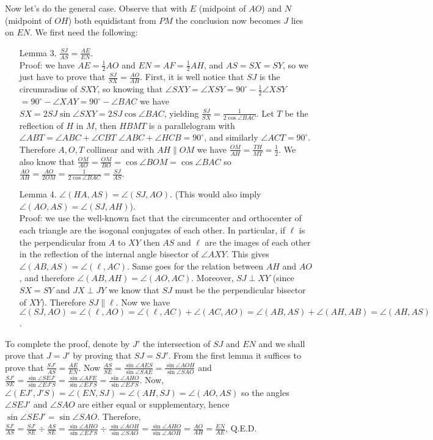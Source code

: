 \documentclass[11pt,a4paper]{article}
\begin{document}
\begin{itemize}
Now let's do the general case. Observe that with $E$ (midpoint of $AO$) and $N$ (midpoint of $OH$) both equidistant from $PM$ the conclusion now becomes $J$ lies on $EN$. We first need the following: 
\begin{itemize}
\item [Lemma 3.] $\frac {SJ}{AS}=\frac {AE}{EN}$.\\
Proof: we have $AE=\frac 12 AO$ and $EN=AF=\frac 12 AH$, and $AS=SX=SY$, 
so we just have to prove that 
$\frac {SJ}{SX}=\frac {AO}{AH}$.
First, it is well notice that $SJ$ is the circumradius of $SXY$, so knowing that $\angle SXY=\angle XSY=90^{\circ}-\frac 12\angle XSY$
$= 90^{\circ}-\angle XAY=90^{\circ}-\angle BAC$ we have 
$SX=2SJ\sin\angle SXY=2SJ\cos\angle BAC$, yielding $\frac {SJ}{SX}=\frac {1}{2\cos\angle BAC}$.
Let $T$ be the reflection of $H$ in $M$, then $HBMT$ is a parallelogram with $\angle ABT=\angle ABC+\angle CBT$
$\angle ABC+\angle HCB=90^{\circ}$, and similarly $\angle ACT=90^{\circ}$. 
Therefore $A, O, T$ collinear and with $AH\parallel OM$ we have $\frac{OM}{AH}=\frac {TH}{MT}=\frac 12$. 
We also know that $\frac {OM}{AO}=\frac {OM}{BO}=\cos\angle BOM=\cos\angle BAC$
so $\frac {AO}{AH}=\frac {AO}{2OM}=\frac 1{2\cos\angle BAC}=\frac {SJ}{AS}$.
\item [Lemma 4.] $\angle (HA, AS)=\angle (SJ, AO)$. (This would also imply $\angle (AO, AS)=\angle (SJ, AH)$).\\
Proof: we use the well-known fact that the circumcenter and orthocenter of each triangle are the isogonal conjugates of each other. 
In particular, if $\ell$ is the perpendicular from $A$ to $XY$ then $AS$ and $\ell$ are the images of each other in the reflection of the internal angle bisector of $\angle AXY$. 
This gives $\angle (AB, AS)=\angle (\ell, AC)$. 
Same goes for the relation between $AH$ and $AO$, and therefore $\angle (AB, AH)=\angle (AO, AC)$. 
Moreover, $SJ\perp XY$ (since $SX=SY$ and $JX\perp JY$ we know that $SJ$ must be the perpendicular bisector of $XY$). 
Therefore $SJ\parallel \ell$. 
Now we have $\angle (SJ, AO)=\angle (\ell, AO)=\angle (\ell, AC)+\angle (AC, AO)=\angle (AB, AS)+\angle (AH, AB)=\angle (AH, AS)$. 
\end{itemize}

To complete the proof, denote by $J'$ the intersection of $SJ$ and $EN$ and we shall prove that $J=J'$ by proving that $SJ=SJ'$. 
From the first lemma it suffices to prove that  $\frac {SJ'}{AS}=\frac {AE}{EN}$. 
Now $\frac {AS}{SE}=\frac{\sin\angle AES}{\sin\angle SAE}=\frac{\sin\angle AOH}{\sin\angle SAO}$ and 
$\frac{SJ'}{SE}=\frac{\sin\angle SEJ'}{\sin\angle EJ'S}=\frac{\sin\angle AFE}{\sin\angle EJ'S}=\frac{\sin\angle AHO}{\sin\angle EJ'S}$. 
Now, $\angle (EJ', J'S)=\angle (EN, SJ)=\angle (AH, SJ)=\angle (AO, AS)$ so the angles $\angle SEJ'$ and $\angle SAO$ are either equal or supplementary, hence $\sin\angle SEJ'=\sin\angle SAO$. 
Therefore, $\frac {SJ'}{AS}=\frac {SJ'}{SE}\div \frac {AS}{SE}= \frac{\sin\angle AHO}{\sin\angle EJ'S}\div\frac{\sin\angle AOH}{\sin\angle SAO}=\frac{\sin\angle AHO}{\sin\angle AOH}=\frac{AO}{AH}=\frac {EN}{AE}$, Q.E.D.


\end{itemize}
\end{document}
